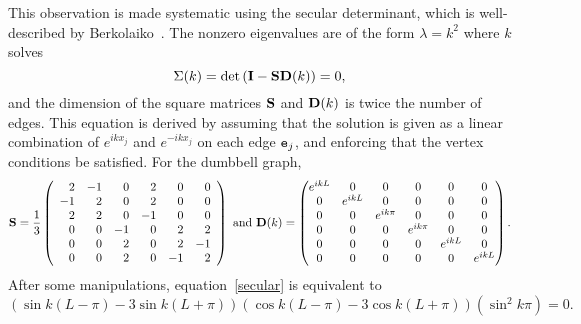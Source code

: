 \documentclass{article}
\numberwithin{equation}{section}
\numberwithin{figure}{section}
\begin{document}
This observation is made systematic using the secular determinant, which is well-described by Berkolaiko~\cite{Berkolaiko:2017}. The nonzero eigenvalues  are of the form $\lambda = k^2$ where $k$ solves
\begin{equation}
\Sigma(k) =   \det{\left(\mathbf{I}- \mathbf{S}\mathbf{D}(k) \right)} = 0,
\label{secular}
\end{equation}
and the dimension of the square matrices $\mathbf{S}$ and $\mathbf{D}(k)$ is twice the number of edges. This equation is derived by assuming that the solution is given as a linear combination of $e^{i k x_j}$ and $e^{-i k x_j}$ on each edge $\mathtt{e}_j$, and enforcing that the vertex conditions be satisfied. For the dumbbell graph,
$$
\mathbf{S}=
\frac{1}{3}
\left(
\begin{array}{rrrrrr}
 2 & -1 & 0 & 2 & 0 & 0 \\
 -1 & 2 & 0 & 2 & 0 & 0 \\
 2 & 2 & 0 & -1 & 0 & 0 \\
 0 & 0 & -1 & 0 & 2 & 2 \\
 0 & 0 & 2 & 0 & 2 & -1 \\
 0 & 0 & 2 & 0 & -1 & 2 \\
\end{array}
\right)
\text{ and }
\mathbf{D}(k) = 
\begin{pmatrix}
e^{i k L} &0 & 0 & 0 & 0 & 0 \\
0 & e^{i k L}& 0 & 0 & 0 & 0 \\
0 & 0 & e^{i k \pi} & 0 & 0 & 0 \\
0 & 0 & 0 & e^{i k \pi} & 0 & 0 \\
0 & 0 & 0 & 0 & e^{i k L} & 0 \\
0 & 0 & 0 & 0 & 0 & e^{i k L}
\end{pmatrix}
.
$$
After some manipulations, equation~\eqref{secular} is equivalent to
\begin{equation}
\left(
\sin{ k(L -\pi ) }-3 \sin{k(L +\pi ) }
\right) 
\left(
\cos{k (L-\pi) }-3 \cos{k (L+\pi ) }
\right)
\left(
\sin^2{k \pi}
\right)
= 0.
\label{secularDet}
\end{equation}
\end{document}

